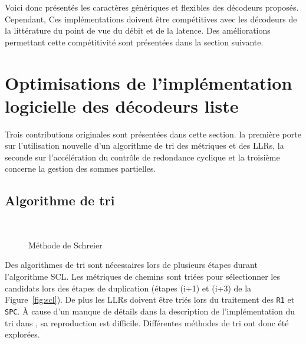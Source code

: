 Voici donc présentés les caractères génériques et flexibles des décodeurs proposés. Cependant, Ces implémentations doivent être compétitives avec les décodeurs de la littérature du point de vue du débit et de la latence. Des améliorations permettant cette compétitivité sont présentées dans la section suivante.

\section{Optimisations de l'implémentation logicielle des décodeurs liste}
\label{sec:opti_scl}
Trois contributions originales sont présentées dans cette section. la première porte sur l'utilisation nouvelle d'un algorithme de tri des métriques et des LLRs, la seconde sur l'accélération du contrôle de redondance cyclique et la troisième concerne la gestion des sommes partielles. 

\subsection{Algorithme de tri}
\begin{figure}[t]
\centering
{}
\\
\caption{Méthode de Schreier}
\label{fig:schreier_sort}
\end{figure}
Des algorithmes de tri sont nécessaires lors de plusieurs étapes durant l'algorithme SCL. Les métriques de chemins sont triées pour sélectionner les candidats lors des étapes de duplication (étapes (i+1) et (i+3) de la Figure~\ref{fig:scl}). De plus les LLRs doivent être triés lors du traitement des \noeuds \texttt{R1} et \texttt{SPC}. \`A cause d'un manque de détails dans la description de l'implémentation du tri dans \cite{sarkis_fast_2016}, sa reproduction est difficile. Différentes méthodes de tri ont donc été explorées.


